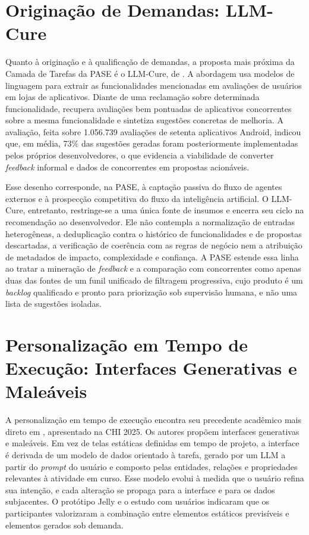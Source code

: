 \section{Originação de Demandas: LLM-Cure}\label{sec:3.4}

Quanto à originação e à qualificação de demandas, a proposta mais próxima da Camada de Tarefas da PASE é o LLM-Cure, de . A abordagem usa modelos de linguagem para extrair as funcionalidades mencionadas em avaliações de usuários em lojas de aplicativos. Diante de uma reclamação sobre determinada funcionalidade, recupera avaliações bem pontuadas de aplicativos concorrentes sobre a mesma funcionalidade e sintetiza sugestões concretas de melhoria. A avaliação, feita sobre 1.056.739 avaliações de setenta aplicativos Android, indicou que, em média, 73\% das sugestões geradas foram posteriormente implementadas pelos próprios desenvolvedores, o que evidencia a viabilidade de converter \textit{feedback} informal e dados de concorrentes em propostas acionáveis.

Esse desenho corresponde, na PASE, à captação passiva do fluxo de agentes externos e à prospecção competitiva do fluxo da inteligência artificial. O LLM-Cure, entretanto, restringe-se a uma única fonte de insumos e encerra seu ciclo na recomendação ao desenvolvedor. Ele não contempla a normalização de entradas heterogêneas, a deduplicação contra o histórico de funcionalidades e de propostas descartadas, a verificação de coerência com as regras de negócio nem a atribuição de metadados de impacto, complexidade e confiança. A PASE estende essa linha ao tratar a mineração de \textit{feedback} e a comparação com concorrentes como apenas duas das fontes de um funil unificado de filtragem progressiva, cujo produto é um \textit{backlog} qualificado e pronto para priorização sob supervisão humana, e não uma lista de sugestões isoladas.

\section{Personalização em Tempo de Execução: Interfaces Generativas e Maleáveis}\label{sec:3.5}

A personalização em tempo de execução encontra seu precedente acadêmico mais direto em , apresentado na CHI 2025. Os autores propõem interfaces generativas e maleáveis. Em vez de telas estáticas definidas em tempo de projeto, a interface é derivada de um modelo de dados orientado à tarefa, gerado por um LLM a partir do \textit{prompt} do usuário e composto pelas entidades, relações e propriedades relevantes à atividade em curso. Esse modelo evolui à medida que o usuário refina sua intenção, e cada alteração se propaga para a interface e para os dados subjacentes. O protótipo Jelly e o estudo com usuários indicaram que os participantes valorizaram a combinação entre elementos estáticos previsíveis e elementos gerados sob demanda.

